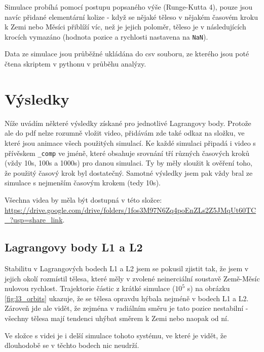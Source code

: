 \documentclass[a4paper,11pt]{article}
\begin{document}
Simulace probíhá pomocí postupu popsaného výše (Runge-Kutta 4), pouze jsou navíc přidané elementární kolize - když se
nějaké těleso v nějakém časovém kroku k Zemi nebo Měsíci přiblíží víc, než je jejich poloměr, těleso je v následujících
krocích vymazáno (hodnota pozice a rychlosti nastavena na \texttt{NaN}).

Data ze simulace jsou průběžné ukládána do csv souboru, ze kterého jsou poté čtena skriptem v pythonu v průběhu analýzy.

\section{Výsledky}

Níže uvádím některé výsledky získané pro jednotlivé Lagrangovy body.
Protože ale do pdf nelze rozumně vložit video, přidávám zde také odkaz
na složku, ve které jsou animace všech použitých simulací. Ke každé simulaci
připadá i video s přívěskem \texttt{\_comp} ve jméně, které obsahuje srovnání
tří různých časových kroků (vždy 10s, 100s a 1000s) pro danou simulaci.
Ty by měly sloužit k ověření toho, že použitý časový krok byl dostatečný.
Samotné výsledky jsem pak vždy bral ze simulace s nejmenším časovým krokem (tedy 10s).

Všechna videa by měla být dostupná v této složce: \url{https://drive.google.com/drive/folders/1fos3M97N6Zq4poEnZLs2Z5JMqUt60TC_?usp=share_link}.

\subsection{Lagrangovy body L1 a L2}

Stabilitu v Lagrangových bodech L1 a L2 jsem se pokusil zjistit tak, že jsem v jejich okolí rozmístil tělesa, které měly 
v zvolené neinerciální soustavě Země-Měsíc nulovou rychlost. Trajektorie částic z krátké simulace ($10^5$ s) na 
obrázku \ref{fig:l3_orbits} ukazuje, 
že se tělesa opravdu hýbala nejméně v bodech L1 a L2. Zároveň jde ale vidět, že zejména v radiálním směru je tato pozice nestabilní -
všechny tělesa mají tendenci uhýbat směrem k Zemi nebo naopak od ní.

Ve složce s videi je i delší simulace tohoto systému, ve které je vidět, že dlouhodobě se v těchto bodech nic neudrží.
\end{document}
